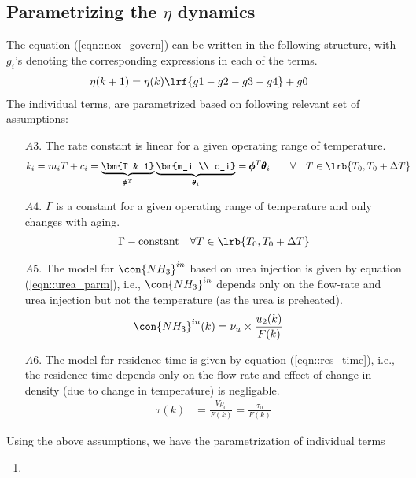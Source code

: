 \subsection{Parametrizing the $\eta$ dynamics}
The equation (\ref{eqn::nox_govern}) can be written in the following structure, with $g_i$'s denoting the corresponding expressions in each of the terms.
\begin{align}
        \eta(k+1) &= \eta(k) \lrf{ g1 - g2 -g3 -g4} + g0
\end{align}
The individual terms, are parametrized based on following relevant set of assumptions:
\begin{itemize}
        \item[$A3.$] The rate constant is linear for a given operating range of temperature.
        \begin{align}
                k_i &= m_i T + c_i = \underbrace{\bm{T & 1}}_{\pmb \phi^T} \underbrace{\bm{m_i \\ c_i}}_{\pmb \theta_i}
                        = \pmb \phi^{T} \pmb \theta_i
                \qquad \forall \quad T \in \lrb{T_0, T_0 + \Delta T}
                \label{eqn::k_mdl}
        \end{align}
        \item[$A4.$] $\Gamma$ is a constant for a given operating range of temperature and only changes with aging.
        \begin{align}
                \Gamma - \text{constant} \quad \forall T \in \lrb{T_0, T_0 + \Delta T}
                \label{eqn::gamma_mdl}
        \end{align}
        \item[$A5.$] The model for $\con{NH_3}^{in}$ based on urea injection is given by equation (\ref{eqn::urea_parm}), i.e., $\con{NH_3}^{in}$ depends only on the flow-rate and urea injection but not the temperature (as the urea is preheated).
        \begin{align}
                \con{NH_3}^{in}(k) &= \nu_u \times \frac{u_2(k)}{F(k)}
                \label{eqn::urea_mdl}
        \end{align}
        \item[$A6.$] The model for residence time is given by equation (\ref{eqn::res_time}), i.e., the residence time depends only on the flow-rate and effect of change in density (due to change in temperature) is negligable.
        \begin{align}
                \tau(k) &= \frac{V \rho_0}{F(k)} = \frac{\tau_0}{F(k)}
                \label{eqn::residence_time_mdl}
        \end{align}
\end{itemize}

Using the above assumptions, we have the parametrization of individual terms
\begin{enumerate}
\item 
\end{enumerate}
